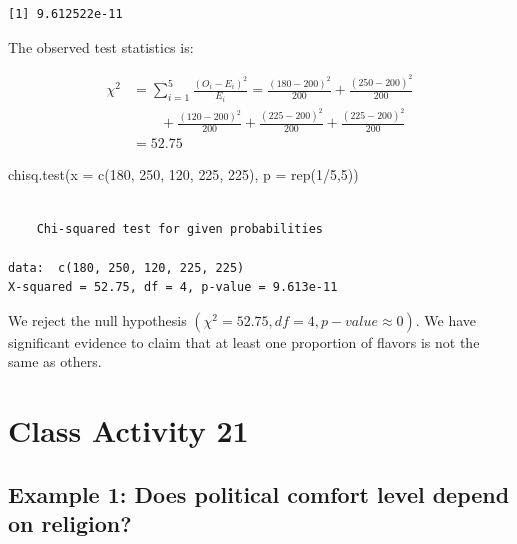\documentclass[
]{book}
\newenvironment{Shaded}{\begin{snugshade}}{\end{snugshade}}
\newcommand{\AttributeTok}[1]{\textcolor[rgb]{0.77,0.63,0.00}{#1}}
\newcommand{\DecValTok}[1]{\textcolor[rgb]{0.00,0.00,0.81}{#1}}
\newcommand{\FunctionTok}[1]{\textcolor[rgb]{0.00,0.00,0.00}{#1}}
\newcommand{\NormalTok}[1]{#1}
\newcommand{\SpecialCharTok}[1]{\textcolor[rgb]{0.00,0.00,0.00}{#1}}
\begin{document}
\begin{verbatim}
[1] 9.612522e-11
\end{verbatim}

The observed test statistics is:

\begin{align*}
\chi^2 &= \sum_{i=1}^5 \frac{(O_i-E_i)^2}{E_i} = \frac{(180 - 200)^2}{200} + \frac{(250 - 200)^2}{200}\\ & \qquad + \frac{(120 - 200)^2}{200} + \frac{(225 - 200)^2}{200} + \frac{(225 - 200)^2}{200}\\
&=  52.75
\end{align*}

\begin{Shaded}
\begin{Highlighting}[]
\FunctionTok{chisq.test}\NormalTok{(}\AttributeTok{x =} \FunctionTok{c}\NormalTok{(}\DecValTok{180}\NormalTok{, }\DecValTok{250}\NormalTok{, }\DecValTok{120}\NormalTok{, }\DecValTok{225}\NormalTok{, }\DecValTok{225}\NormalTok{), }\AttributeTok{p =} \FunctionTok{rep}\NormalTok{(}\DecValTok{1}\SpecialCharTok{/}\DecValTok{5}\NormalTok{,}\DecValTok{5}\NormalTok{))}
\end{Highlighting}
\end{Shaded}

\begin{verbatim}

    Chi-squared test for given probabilities

data:  c(180, 250, 120, 225, 225)
X-squared = 52.75, df = 4, p-value = 9.613e-11
\end{verbatim}

We reject the null hypothesis \((\chi^2 = 52.75, df = 4, p-value \approx 0)\). We have significant evidence to claim that at least one proportion of flavors is not the same as others.

\hypertarget{class-activity-21}{%
\chapter{Class Activity 21}\label{class-activity-21}}

\hypertarget{example-1-does-political-comfort-level-depend-on-religion}{%
\section{Example 1: Does political comfort level depend on religion?}\label{example-1-does-political-comfort-level-depend-on-religion}}
\end{document}
